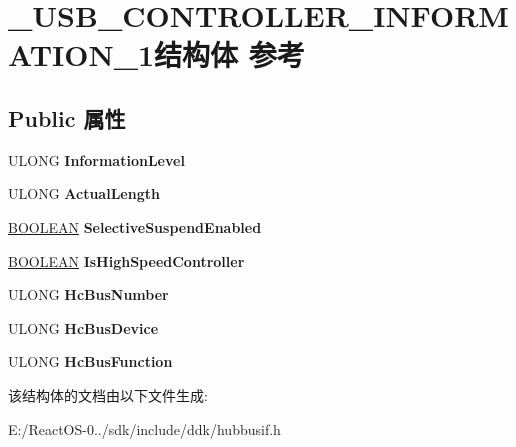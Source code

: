\hypertarget{struct___u_s_b___c_o_n_t_r_o_l_l_e_r___i_n_f_o_r_m_a_t_i_o_n__1}{}\section{\+\_\+\+U\+S\+B\+\_\+\+C\+O\+N\+T\+R\+O\+L\+L\+E\+R\+\_\+\+I\+N\+F\+O\+R\+M\+A\+T\+I\+O\+N\+\_\+1结构体 参考}
\label{struct___u_s_b___c_o_n_t_r_o_l_l_e_r___i_n_f_o_r_m_a_t_i_o_n__1}
\subsection*{Public 属性}
\begin{DoxyCompactItemize}
\item 
\mbox{\label{struct___u_s_b___c_o_n_t_r_o_l_l_e_r___i_n_f_o_r_m_a_t_i_o_n__1_acb2b9883cd8da3418e39727f5c8f3603}} 
U\+L\+O\+NG {\bfseries Information\+Level}
\item 
\mbox{\label{struct___u_s_b___c_o_n_t_r_o_l_l_e_r___i_n_f_o_r_m_a_t_i_o_n__1_ad88abb9a02452b147b12293e8bae1bf7}} 
U\+L\+O\+NG {\bfseries Actual\+Length}
\item 
\mbox{\label{struct___u_s_b___c_o_n_t_r_o_l_l_e_r___i_n_f_o_r_m_a_t_i_o_n__1_a16a8401257de1e6ba0ad38e6c8adfc11}} 
\hyperlink{_processor_bind_8h_a112e3146cb38b6ee95e64d85842e380a}{B\+O\+O\+L\+E\+AN} {\bfseries Selective\+Suspend\+Enabled}
\item 
\mbox{\label{struct___u_s_b___c_o_n_t_r_o_l_l_e_r___i_n_f_o_r_m_a_t_i_o_n__1_a3d2dc0e1f27377422ae59e7f011ed9c3}} 
\hyperlink{_processor_bind_8h_a112e3146cb38b6ee95e64d85842e380a}{B\+O\+O\+L\+E\+AN} {\bfseries Is\+High\+Speed\+Controller}
\item 
\mbox{\label{struct___u_s_b___c_o_n_t_r_o_l_l_e_r___i_n_f_o_r_m_a_t_i_o_n__1_afb14e922f637dd42251044b94cb2484c}} 
U\+L\+O\+NG {\bfseries Hc\+Bus\+Number}
\item 
\mbox{\label{struct___u_s_b___c_o_n_t_r_o_l_l_e_r___i_n_f_o_r_m_a_t_i_o_n__1_a6c2133531a9d565930cf2ecb81ec0de1}} 
U\+L\+O\+NG {\bfseries Hc\+Bus\+Device}
\item 
\mbox{\label{struct___u_s_b___c_o_n_t_r_o_l_l_e_r___i_n_f_o_r_m_a_t_i_o_n__1_acc803c7d95c1d14abfcfd81a9059fc40}} 
U\+L\+O\+NG {\bfseries Hc\+Bus\+Function}
\end{DoxyCompactItemize}


该结构体的文档由以下文件生成\+:\begin{DoxyCompactItemize}
\item 
E\+:/\+React\+O\+S-\/0../sdk/include/ddk/hubbusif.\+h\end{DoxyCompactItemize}

